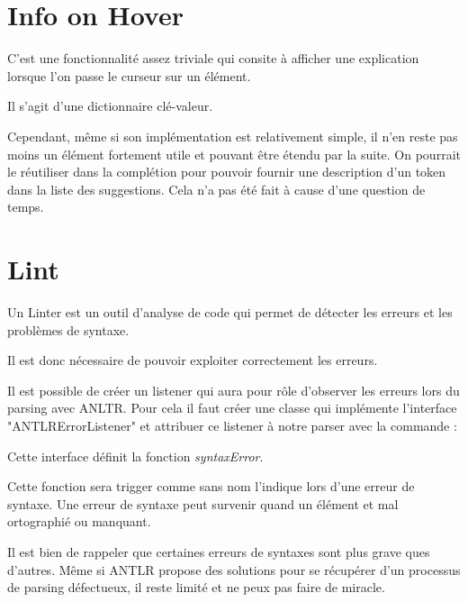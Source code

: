 \documentclass[
    iict, %
    il, %
]{heig-tb}
\begin{document}
\section{Info on Hover}

C'est une fonctionnalité assez triviale qui consite à afficher une explication lorsque l'on passe le curseur sur un élément.

Il s'agit d'une dictionnaire clé-valeur.

Cependant, même si son implémentation est relativement simple, il n'en reste pas moins un élément fortement utile et pouvant être étendu par la suite.
On pourrait le réutiliser dans la complétion pour pouvoir fournir une description d'un token dans la liste des suggestions.
Cela n'a pas été fait à cause d'une question de temps.





\section{Lint}
Un Linter est un outil d'analyse de code qui permet de détecter les erreurs et les problèmes de syntaxe.

Il est donc nécessaire de pouvoir exploiter correctement les erreurs.

Il est possible de créer un listener qui aura pour rôle d'observer les erreurs lors du parsing avec ANLTR.
Pour cela il faut créer une classe qui implémente l'interface "ANTLRErrorListener" et attribuer ce listener à notre parser
avec la commande :

Cette interface définit la fonction \emph{syntaxError}.

Cette fonction sera trigger comme sans nom l'indique lors d'une erreur de syntaxe.
Une erreur de syntaxe peut survenir quand un élément et mal ortographié ou manquant.

Il est bien de rappeler que certaines erreurs de syntaxes sont plus grave ques d'autres.
Même si ANTLR propose des solutions pour se récupérer d'un processus de parsing défectueux, il reste limité et ne peux pas faire de miracle.
\end{document}
